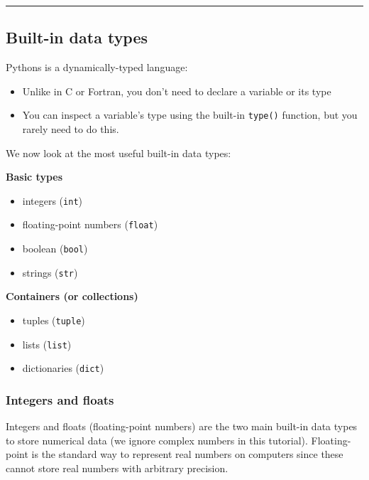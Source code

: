 \documentclass[10pt]{scrartcl}
\providecommand{\tightlist}{%
      \setlength{\itemsep}{0pt}\setlength{\parskip}{0pt}}
\begin{document}
    \begin{center}\rule{0.5\linewidth}{0.5pt}\end{center}

\hypertarget{built-in-data-types}{%
\subsection{Built-in data types}\label{built-in-data-types}}

Pythons is a dynamically-typed language:

\begin{itemize}
\tightlist
\item
  Unlike in C or Fortran, you don't need to declare a variable or its
  type
\item
  You can inspect a variable's type using the built-in \texttt{type()}
  function, but you rarely need to do this.
\end{itemize}

We now look at the most useful built-in data types:

\textbf{Basic types}

\begin{itemize}
\tightlist
\item
  integers (\texttt{int})
\item
  floating-point numbers (\texttt{float})
\item
  boolean (\texttt{bool})
\item
  strings (\texttt{str})
\end{itemize}

\textbf{Containers (or collections)}

\begin{itemize}
\tightlist
\item
  tuples (\texttt{tuple})
\item
  lists (\texttt{list})
\item
  dictionaries (\texttt{dict})
\end{itemize}

    \hypertarget{integers-and-floats}{%
\subsubsection{Integers and floats}\label{integers-and-floats}}

Integers and floats (floating-point numbers) are the two main built-in
data types to store numerical data (we ignore complex numbers in this
tutorial). Floating-point is the standard way to represent real numbers
on computers since these cannot store real numbers with arbitrary
precision.
\end{document}
